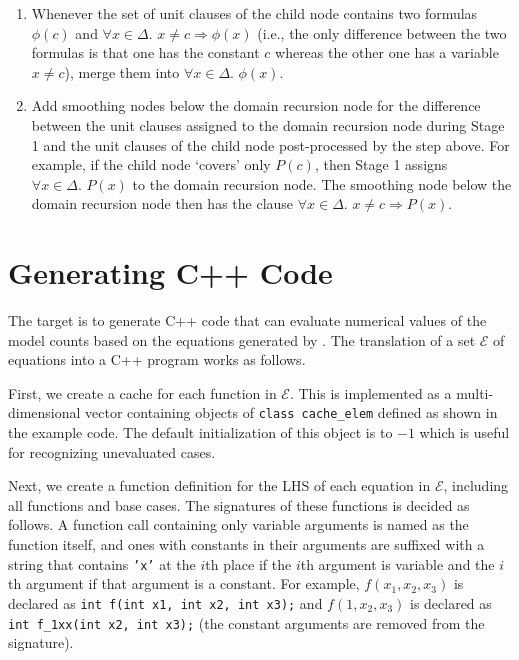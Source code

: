 \documentclass{article}
\theoremstyle{definition}
\begin{document}
\begin{enumerate}
  \item Whenever the set of unit clauses of the child node contains two formulas
        $\phi(c)$ and $\forall x \in \Delta\text{.
        } x \ne c \Rightarrow \phi(x)$ (i.e., the only difference between the
        two formulas is that one has the constant $c$ whereas the other one has
        a variable $x \ne c$), merge them into $\forall x \in \Delta\text{.
        }\phi(x)$.
  \item Add smoothing nodes below the domain recursion node for the difference
        between the unit clauses assigned to the domain recursion node during
        Stage 1 and the unit clauses of the child node post-processed by the
        step above. For example, if the child node `covers' only $P(c)$, then
        Stage 1 assigns $\forall x \in \Delta\text{. }P(x)$ to the domain
        recursion node. The smoothing node below the domain recursion node then
        has the clause $\forall x \in \Delta\text{. } x \ne c \Rightarrow P(x)$.
\end{enumerate}


\section{Generating C++ Code}\label{sec:cpp}

The target is to generate C++ code that can evaluate numerical values of the
model counts based on the equations generated by \CompileWithBaseCases. The
translation of a set $\mathcal{E}$ of equations into a C++ program works as
follows.

First, we create a cache for each function in $\mathcal{E}$. This is implemented
as a multi-dimensional vector containing objects of \texttt{class cache\_elem}
defined as shown in the example code. The default initialization of this object
is to $-1$ which is useful for recognizing unevaluated cases.

Next, we create a function definition for the LHS of each equation in
$\mathcal{E}$, including all functions and base cases. The signatures of these
functions is decided as follows. A function call containing only variable
arguments is named as the function itself, and ones with constants in their
arguments are suffixed with a string that contains \texttt{'x'} at the $i$th
place if the $i$th argument is variable and the $i$th argument if that argument
is a constant. For example, $f(x_{1}, x_{2}, x_{3})$ is declared as \texttt{int
  f(int x1, int x2, int x3);} and $f(1, x_{2}, x_{3})$ is declared as
\texttt{int f\_1xx(int x2, int x3);} (the constant arguments are removed from
the signature).
\end{document}
